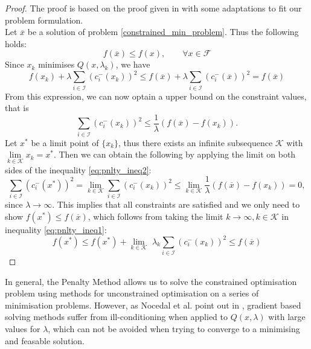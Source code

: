 \begin{proof}
	The proof is based on the proof given in \cite{NoceWrig06} with some adaptations to fit our problem formulation.\\
	Let $\overline{x}$ be a solution of problem \ref{constrained_min_problem}. Thus the following holds: \[ f(\overline{x}) \leq f(x), \qquad \forall x \in \mathcal{F}\]
	Since $x_k$ minimises $Q(x, \lambda_k)$, we have 
	\begin{equation}
	\label{eq:pnlty_ineq1}
	f(x_k) + \lambda \sum_{i \in \mathcal{I}} (c_i^{-}(x_k))^2 \leq 
	f(\overline{x}) + \lambda \sum_{i \in \mathcal{I}} (c_i^{-}(\overline{x}))^2 =
	f(\overline{x})
	\end{equation}
	From this expression, we can now optain a upper bound on the constraint values, that is
	\begin{equation}
	\label{eq:pnlty_ineq2}
	\sum_{i \in \mathcal{I}} (c_i^{-}(x_k))^2 \leq \frac{1}{\lambda} (f(\overline{x}) - f(x_k)).
	\end{equation}
	Let $x^*$ be a limit point of $\{x_k\}$, thus there exists an infinite subsequence $\mathcal{K}$ with $\underset{k \in \mathcal{K}}{\lim} x_k = x^*$. Then we can obtain the following by applying the limit on both sides of the inequality \ref{eq:pnlty_ineq2}:
	\[ 
	\sum_{i \in \mathcal{I}} (c_i^{-}(x^*))^2 = 
	\underset{k \in \mathcal{K}}{\lim} \sum_{i \in \mathcal{I}} (c_i^{-}(x_k))^2 \leq
	\underset{k \in \mathcal{K}}{\lim} \frac{1}{\lambda} (f(\overline{x}) - f(x_k)) = 0,
	 \]
	 since $\lambda \to \infty$. This implies that all constraints are satisfied and we only need to show $f(x^*) \leq f(\overline{x})$, which follows from taking the limit $k \to \infty, k \in \mathcal{K}$ in inequality \ref{eq:pnlty_ineq1}:
	 \[ f(x^*) \leq f(x^*) +  \underset{k \in \mathcal{K}}{\lim} \,\,\lambda_k \sum_{i \in \mathcal{I}} (c_i^{-}(x_k))^2 \leq f(\overline{x})\]
\end{proof}

In general, the Penalty Method allows us to solve the constrained optimisation problem using methods for unconstrained optimisation on a series of minimisation problems. However, as Nocedal et al. point out in \cite{NoceWrig06}, gradient based solving methods suffer from ill-conditioning when applied to $Q(x, \lambda)$ with large values for $\lambda$, which can not be avoided when trying to converge to a minimising and feasable solution.

